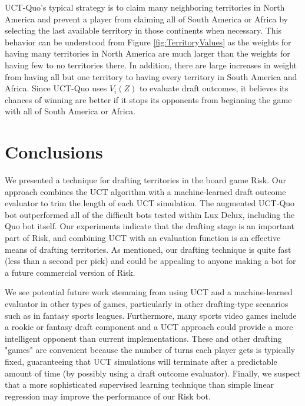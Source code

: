 \documentclass[letterpaper]{article}
\numberwithin{equation}{section}
\numberwithin{theorem}{section}
\numberwithin{lemma}{section}
\numberwithin{df}{section}
\begin{document}
UCT-Quo's typical strategy is to claim many neighboring territories in North America and prevent a player from claiming all of South America or Africa by selecting the last available territory in those continents when necessary.  This behavior can be understood from Figure \ref{fig:TerritoryValues} as the weights for having many territories in North America are much larger than the weights for having few to no territories there.  In addition, there are large increases in weight from having all but one territory to having every territory in South America and Africa.  Since UCT-Quo uses $V_i(Z)$ to evaluate draft outcomes, it believes its chances of winning are better if it stops its opponents from beginning the game with all of South America or Africa.

\section{Conclusions}



We presented a technique for drafting territories in the board game Risk.  Our approach combines the UCT algorithm with a machine-learned draft outcome evaluator to trim the length of each UCT simulation.  The augmented UCT-Quo bot outperformed all of the difficult bots tested within Lux Delux, including the Quo bot itself.  Our experiments indicate that the drafting stage is an important part of Risk, and combining UCT with an evaluation function is an effective means of drafting territories.  As mentioned, our drafting technique is quite fast (less than a second per pick) and could be appealing to anyone making a bot for a future commercial version of Risk.

We see potential future work stemming from using UCT and a machine-learned evaluator in other types of games, particularly in other drafting-type scenarios such as in fantasy sports leagues.  Furthermore, many sports video games include a rookie or fantasy draft component and a UCT approach could provide a more intelligent opponent than current implementations.  These and other drafting "games" are convenient because the number of turns each player gets is typically fixed, guaranteeing that UCT simulations will terminate after a predictable amount of time (by possibly using a draft outcome evaluator).  Finally, we suspect that a more sophisticated supervised learning technique than simple linear regression may improve the performance of our Risk bot.  


%
%


\end{document}
